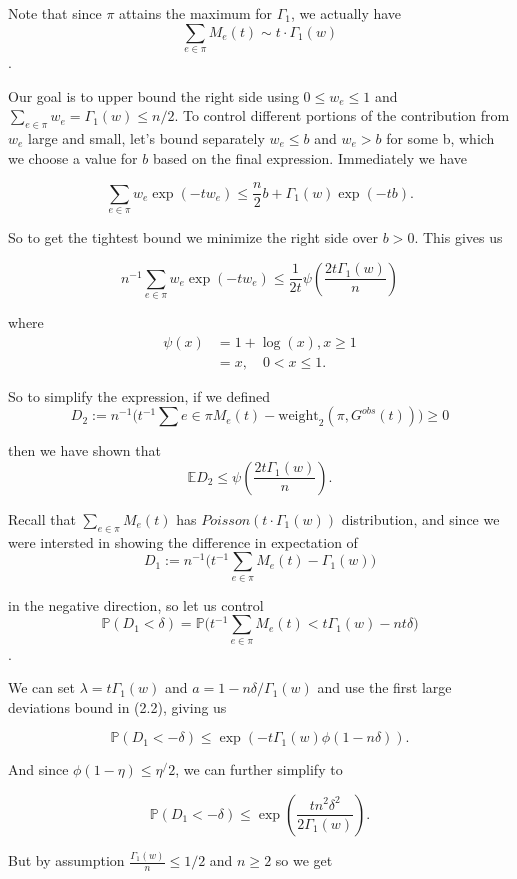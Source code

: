 Note that since $\pi$ attains the maximum for $\Gamma_1$, we actually have  
$$ \sum_{e \in \pi} M_e(t) \sim t \cdot \Gamma_1(w)$$.  

Our goal is to upper bound the right side using $0 \leq w_e \leq 1$ and $\sum_{e\in \pi}w_e = \Gamma_1(w) \leq n/2$.  To control different portions of the contribution from $w_e$ large and small, let's bound separately $w_e \leq b$ and $w_e > b$ for some b, which we choose a value for $b$  based on the final expression.  Immediately we have 

$$\sum_{e\in \pi}w_e\exp(-tw_e) \leq \frac{n}{2}b + \Gamma_1(w)\exp(-t b).$$

So to get the tightest bound we minimize the right side over $b > 0$.  This gives us

$$n^{-1}\sum_{e \in \pi}w_e \exp(-tw_e) \leq \frac{1}{2t}\psi(\frac{2t\Gamma_1(w)}{n})$$

where 
\begin{equation}
\begin{split}
\psi(x) &= 1+\log(x), x \geq 1\\
&= x,\quad  0 < x \leq 1.
\end{split}
\end{equation}


So to simplify the expression, if we defined $$D_2:= n^{-1}\bigg(t^{-1}\sum{e \in \pi} M_e(t) - \text{weight}_2(\pi, G^{obs}(t))\bigg) \geq 0$$

then we have shown that $$\mathbb{E}D_2 \leq \psi(\frac{2t\Gamma_1(w)}{n}).$$

Recall that $\sum_{e \in \pi}M_e(t)$  has $Poisson(t\cdot\Gamma_1(w))$ distribution, and since we were intersted in showing the difference in expectation of 
$$ D_1 := n^{-1}\bigg(t^{-1}\sum_{e \in \pi}M_e(t) - \Gamma_1(w)\bigg)$$ 

in the negative direction, so let us control 
$$ \mathbb{ P}(D_1 < \delta)  = \mathbb{P}\bigg(t^{-1}\sum_{e \in \pi}M_e(t) < t\Gamma_1(w) - nt\delta\bigg)$$.  

We can set $\lambda = t \Gamma_1(w)$ and $a = 1-n\delta/\Gamma_1(w)$ and use the first large deviations bound in (2.2), giving us

$$\mathbb{P}(D_1 < -\delta) \leq \exp(-t\Gamma_1(w)\phi(1-n\delta)).$$

And since $\phi(1-\eta) \leq \eta^/2$, we can further simplify to 

$$ \mathbb{P}(D_1 < -\delta) \leq \exp(\frac{tn^2\delta^2}{2\Gamma_1(w)}).$$

But by assumption $\frac{\Gamma_1(w)}{n}\leq 1/2$ and $n \geq 2$ so we get 

